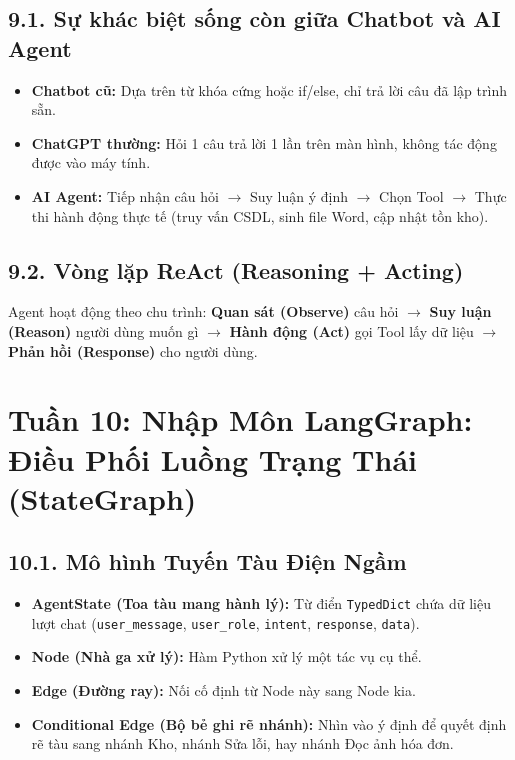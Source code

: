 \documentclass[11pt,a4paper]{article}
\begin{document}
\subsection{9.1. Sự khác biệt sống còn giữa Chatbot và AI Agent}
\begin{itemize}
    \item \textbf{Chatbot cũ:} Dựa trên từ khóa cứng hoặc if/else, chỉ trả lời câu đã lập trình sẵn.
    \item \textbf{ChatGPT thường:} Hỏi 1 câu trả lời 1 lần trên màn hình, không tác động được vào máy tính.
    \item \textbf{AI Agent:} Tiếp nhận câu hỏi $\rightarrow$ Suy luận ý định $\rightarrow$ Chọn Tool $\rightarrow$ Thực thi hành động thực tế (truy vấn CSDL, sinh file Word, cập nhật tồn kho).
\end{itemize}

\subsection{9.2. Vòng lặp ReAct (Reasoning + Acting)}
Agent hoạt động theo chu trình: \textbf{Quan sát (Observe)} câu hỏi $\rightarrow$ \textbf{Suy luận (Reason)} người dùng muốn gì $\rightarrow$ \textbf{Hành động (Act)} gọi Tool lấy dữ liệu $\rightarrow$ \textbf{Phản hồi (Response)} cho người dùng.

\section{Tuần 10: Nhập Môn LangGraph: Điều Phối Luồng Trạng Thái (StateGraph)}

\subsection{10.1. Mô hình Tuyến Tàu Điện Ngầm}
\begin{itemize}
    \item \textbf{AgentState (Toa tàu mang hành lý):} Từ điển \texttt{TypedDict} chứa dữ liệu lượt chat (\texttt{user\_message}, \texttt{user\_role}, \texttt{intent}, \texttt{response}, \texttt{data}).
    \item \textbf{Node (Nhà ga xử lý):} Hàm Python xử lý một tác vụ cụ thể.
    \item \textbf{Edge (Đường ray):} Nối cố định từ Node này sang Node kia.
    \item \textbf{Conditional Edge (Bộ bẻ ghi rẽ nhánh):} Nhìn vào ý định để quyết định rẽ tàu sang nhánh Kho, nhánh Sửa lỗi, hay nhánh Đọc ảnh hóa đơn.
\end{itemize}
\end{document}
